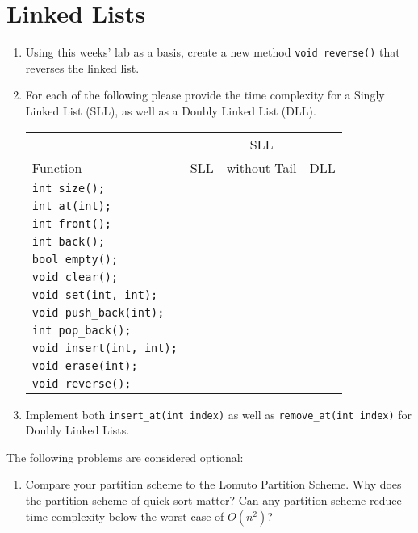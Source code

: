 \documentclass[11pt]{article}
\begin{document}
\section{Linked Lists} 
\begin{enumerate}
    \item Using this weeks' lab as a basis, create a new method \verb|void reverse()| that reverses the linked list.

    \item For each of the following please provide the time complexity for a Singly Linked List (SLL), as well as a Doubly Linked List (DLL). 
    
    \begin{tabular}{l | c | c | c}
                 &     & SLL          &  \\ 
        Function & SLL & without Tail & DLL \\ \hline
        \verb|int size();| & & & \\ \hline
        \verb|int at(int);| & & & \\ \hline
        \verb|int front();| & & & \\ \hline
        \verb|int back();| & & & \\ \hline
        \verb|bool empty();| & & & \\ \hline
        \verb|void clear();| & & & \\ \hline
        \verb|void set(int, int);| & & & \\ \hline
        \verb|void push_back(int);| & & & \\ \hline
        \verb|int pop_back();| & & & \\ \hline
        \verb|void insert(int, int);| & & & \\ \hline
        \verb|void erase(int);| & & & \\ \hline
        \verb|void reverse();| & & & \\ \hline
    \end{tabular}

    \item Implement both \verb|insert_at(int index)| as well as \verb|remove_at(int index)| for Doubly Linked Lists.
\end{enumerate}

The following problems are considered optional:

\begin{enumerate}
    \item Compare your partition scheme to the Lomuto Partition Scheme. Why does the partition scheme of quick sort matter? Can any partition scheme reduce time complexity below the worst case of $O(n^2)$?
\end{enumerate}

\label{r:lastpage}
\end{document}
